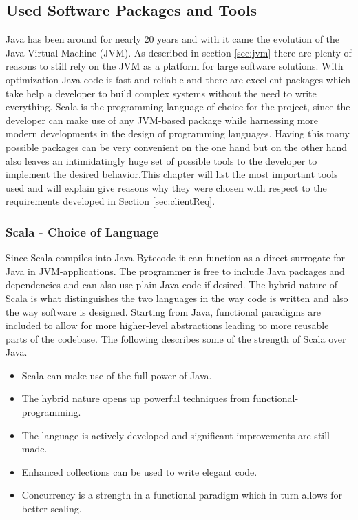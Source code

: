 \documentclass[twoside, 11pt]{scrartcl}
\begin{document}
\subsection{Used Software Packages and Tools}
\label{sec:softwarePackages}
Java has been around for nearly 20 years \cite{link:javaRelease1} and with it came the evolution of the Java Virtual Machine (JVM). As described in section \ref{sec:jvm} there are plenty of reasons to still rely on the JVM as a platform for large software solutions. With optimization Java code is fast and reliable and there are excellent packages which take help a developer to build complex systems without the need to write everything.
Scala is the programming language of choice for the project, since the developer can make use of any JVM-based package while harnessing more modern developments in the design of programming languages. Having this many possible packages can be very convenient on the one hand but on the other hand also leaves an intimidatingly huge set of possible tools to the developer to implement the desired behavior.This chapter will list the most important tools used and will explain give reasons why they were chosen with respect to the requirements developed in Section \ref{sec:clientReq}.

\subsubsection{Scala - Choice of Language} %
Since Scala compiles into Java-Bytecode it can function as a direct surrogate for Java in JVM-applications. The programmer is free to include Java packages and dependencies and can also use plain Java-code if desired.  The hybrid nature of Scala is what distinguishes the two languages in the way code is written and also the way software is designed. Starting from Java, functional paradigms are included to allow for more higher-level abstractions leading to more reusable parts of the codebase. The following describes some of the strength of Scala over Java.\\

\begin{itemize}
	\item Scala can make use of the full power of Java.
	\item The hybrid nature opens up powerful techniques from functional-programming. 
	\item The language is actively developed and significant improvements are still made.
	\item Enhanced collections can be used to write elegant code.
	\item Concurrency is a strength in a functional paradigm which in turn allows for better scaling.
\end{itemize}
\end{document}

